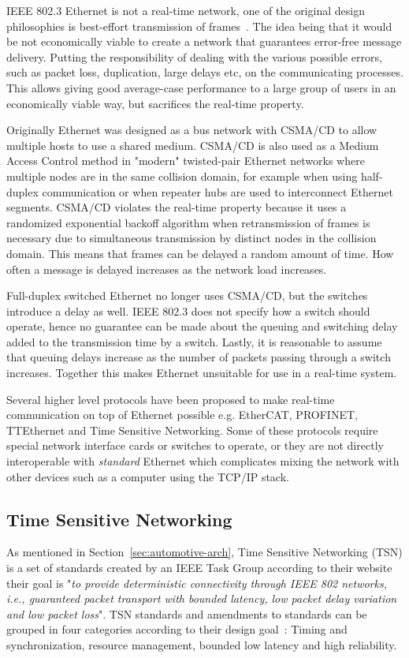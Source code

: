 IEEE 802.3 Ethernet is not a real-time network, one of the original design philosophies is best-effort transmission of frames~\cite{metcalfe1976ethernet}. The idea being that it would be not economically viable to create a network that guarantees error-free message delivery. Putting the responsibility of dealing with the various possible errors, such as packet loss, duplication, large delays etc, on the communicating processes. This allows giving good average-case performance to a large group of users in an economically viable way, but sacrifices the real-time property. 

Originally Ethernet was designed as a bus network with CSMA/CD to allow multiple hosts to use a shared medium. CSMA/CD is also used as a Medium Access Control method in "modern" twisted-pair Ethernet networks where multiple nodes are in the same collision domain, for example when using half-duplex communication or when repeater hubs are used to interconnect Ethernet segments. CSMA/CD violates the real-time property because it uses a randomized exponential backoff algorithm when retransmission of frames is necessary due to simultaneous transmission by distinct nodes in the collision domain. This means that frames can be delayed a random amount of time. How often a message is delayed increases as the network load increases.

Full-duplex switched Ethernet no longer uses CSMA/CD, but the switches introduce a delay as well. IEEE 802.3 does not specify how a switch should operate, hence no guarantee can be made about the queuing and switching delay added to the transmission time by a switch. Lastly, it is reasonable to assume that queuing delays increase as the number of packets passing through a switch increases. Together this makes Ethernet unsuitable for use in a real-time system. 

Several higher level protocols have been proposed to make real-time communication on top of Ethernet possible e.g. EtherCAT, PROFINET, TTEthernet and Time Sensitive Networking. Some of these protocols require special network interface cards or switches to operate, or they are not directly interoperable with \textit{standard} Ethernet which complicates mixing the network with other devices such as a computer using the TCP/IP stack. 

\subsection{Time Sensitive Networking}
\label{sec:tsn}
As mentioned in Section~\ref{sec:automotive-arch}, Time Sensitive Networking (TSN) is a set of standards created by an IEEE Task Group according to their website their goal is "\textit{to provide deterministic connectivity through IEEE 802 networks, i.e., guaranteed packet transport with bounded latency, low packet delay variation and low packet loss}". TSN standards and amendments to standards can be grouped in four categories according to their design goal~\cite{ashjaei2021time}: Timing and synchronization, resource management, bounded low latency and high reliability.

